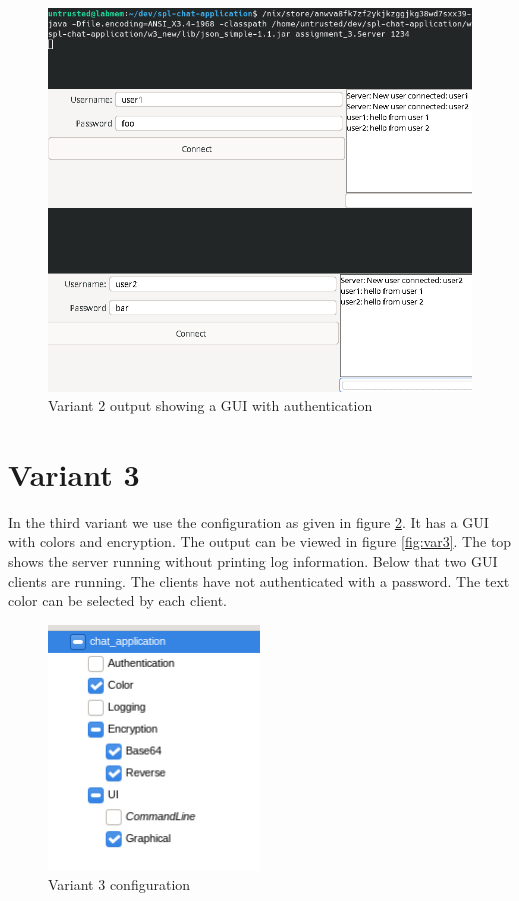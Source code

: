 \documentclass{article}
\begin{document}
\begin{figure}[!htbp]
    \centering
    \includegraphics[width=1.0\textwidth]{figures/variant2.png}
    \caption{Variant 2 output showing a GUI with authentication}
    \label{fig:var2}
\end{figure}

\section*{Variant 3}

In the third variant we use the configuration as given in figure \ref{fig:var3_config}. It has a GUI with colors and encryption. The output can be viewed in figure \ref{fig:var3}. The top shows the server running without printing log information. Below that two GUI clients are running. The clients have not authenticated with a password. The text color can be selected by each client.

\begin{figure}[!htbp]
    \centering
    \includegraphics[width=0.5\textwidth]{figures/variant3_config.png}
    \caption{Variant 3 configuration}
    \label{fig:var3_config}
\end{figure}
\end{document}
